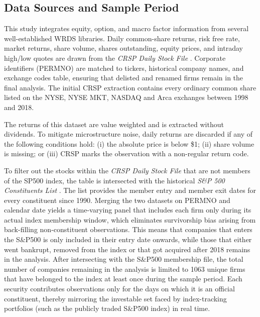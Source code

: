 






\subsection{Data Sources and Sample Period}\label{sec:data_sources}

This study integrates equity, option, and macro factor information from several well-established WRDS libraries. Daily common-share returns, risk free rate, market returns, share volume, shares outstanding, equity prices, and intraday high/low quotes are drawn from the \emph{CRSP Daily Stock File} \cite{crsp_dsf}. Corporate identifiers (PERMNO) are matched to tickers, historical company names, and exchange codes table, ensuring that delisted and renamed firms remain in the final analysis. The initial CRSP extraction contains every ordinary common share listed on the NYSE, NYSE MKT, NASDAQ and Arca exchanges between 1998 and 2018. 

The returns of this dataset are value weighted and is extracted without dividends. To mitigate microstructure noise, daily returns are discarded if any of the following conditions hold: (i) the absolute price is below \$1; (ii) share volume is missing; or (iii) CRSP marks the observation with a non-regular return code.

To filter out the stocks within the \emph{CRSP Daily Stock File}  that are not members of the SP500 index, the table is intersected with the historical \emph{S\&P 500 Constituents List} \cite{compstat}. The list provides the member entry  and member exit dates for every constituent since 1990. Merging the two datasets on PERMNO and calendar date yields a time-varying panel that includes each firm only during its actual index membership window, which eliminates survivorship bias arising from back-filling non-constituent observations. This means that companies that enters the S\&P500 is only included in their entry date onwards, while those that either went bankrupt, removed from the index or that got acquired after 2018 remains in the analysis. After intersecting with the S\&P500 membership file, the total number of companies remaining in the analysis is limited to 1063 unique firms that have belonged to the index at least once during the sample period. Each security contributes observations only for the days on which it is an official constituent, thereby mirroring the investable set faced by index-tracking portfolios (such as the publicly traded S\&P500 index) in real time.

